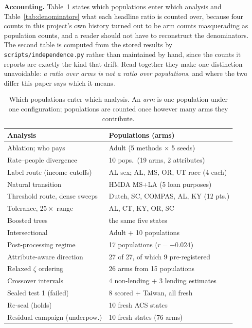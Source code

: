 \documentclass[9pt,conference]{IEEEtran}
\begin{document}
\textbf{Accounting.} Table~\ref{tab:accounting} states which populations enter which
analysis and Table~\ref{tab:denominators} what each headline ratio is counted over, because
four counts in this project's own history turned out to be arm counts masquerading as
population counts, and a reader should not have to reconstruct the denominators. The second
table is computed from the stored results by \texttt{scripts/independence.py} rather than
maintained by hand, since the counts it reports are exactly the kind that drift. Read
together they make one distinction unavoidable: \emph{a ratio over arms is not a ratio over
populations}, and where the two differ this paper says which it means.

\begin{table}[t]
\caption{Which populations enter which analysis. An \emph{arm} is one population under one
configuration; populations are counted once however many arms they contribute.}
\label{tab:accounting}
\centering
\footnotesize
\setlength{\tabcolsep}{3pt}
\begin{tabular}{@{}ll@{}}
\toprule
\textbf{Analysis} & \textbf{Populations (arms)} \\
\midrule
Ablation; who pays & Adult (5 methods $\times$ 5 seeds) \\
Rate--people divergence & 10 pops.\ (19 arms, 2 attributes) \\
Label route (income cutoffs) & AL sex; AL, MS, OR, UT race (4 each) \\
Natural transition & HMDA MS+LA (5 loan purposes) \\
Threshold route, dense sweeps & Dutch, SC, COMPAS, AL, KY (12 pts.) \\
Tolerance, $25\times$ range & AL, CT, KY, OR, SC \\
Boosted trees & the same five states \\
Intersectional & Adult + 10 populations \\
Post-processing regime & 17 populations ($r=-0.024$) \\
Attribute-aware direction & 27 of 27, of which 9 pre-registered \\
Relaxed $\zeta$ ordering & 26 arms from 15 populations \\
Crossover intervals & 4 non-lending + 3 lending estimates \\
Sealed test 1 (failed) & 8 scored + Taiwan, all fresh \\
Re-seal (holds) & 10 fresh ACS states \\
Residual campaign (underpow.) & 10 fresh states (76 arms) \\

\end{tabular}
\end{table}
\end{document}
